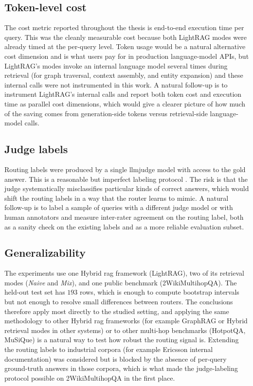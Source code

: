 \documentclass[english, bibtex]{kththesis}               %
\numberwithin{listing}{chapter}
\begin{document}
\subsection{Token-level cost}
\label{sec:limitTokenCost}

The cost metric reported throughout the thesis is end-to-end execution time per query. This was the cleanly measurable cost because both LightRAG modes were already timed at the per-query level. Token usage would be a natural alternative cost dimension and is what users pay for in production language-model APIs, but LightRAG's modes invoke an internal language model several times during retrieval (for graph traversal, context assembly, and entity expansion) and these internal calls were not instrumented in this work. A natural follow-up is to instrument LightRAG's internal calls and report both token cost and execution time as parallel cost dimensions, which would give a clearer picture of how much of the saving comes from generation-side tokens versus retrieval-side language-model calls.

\subsection{Judge labels}
\label{sec:limitJudgeLabels}

Routing labels were produced by a single \gls{llmjudge} model with access to the gold answer. This is a reasonable but imperfect labeling protocol \cite{zheng2023judge}. The risk is that the judge systematically misclassifies particular kinds of correct answers, which would shift the routing labels in a way that the router learns to mimic. A natural follow-up is to label a sample of queries with a different judge model or with human annotators and measure inter-rater agreement on the routing label, both as a sanity check on the existing labels and as a more reliable evaluation subset.

\subsection{Generalizability}
\label{sec:limitGeneralizability}

The experiments use one Hybrid \gls{rag} framework (LightRAG), two of its retrieval modes (\emph{Naive} and \emph{Mix}), and one public benchmark (2WikiMultihopQA). The held-out test set has $193$ rows, which is enough to compute bootstrap intervals but not enough to resolve small differences between routers. The conclusions therefore apply most directly to the studied setting, and applying the same methodology to other Hybrid \gls{rag} frameworks (for example GraphRAG or Hybrid retrieval modes in other systems) or to other multi-hop benchmarks (HotpotQA, MuSiQue) is a natural way to test how robust the routing signal is. Extending the routing labels to industrial corpora (for example Ericsson internal documentation) was considered but is blocked by the absence of per-query ground-truth answers in those corpora, which is what made the judge-labeling protocol possible on 2WikiMultihopQA in the first place.
\end{document}
